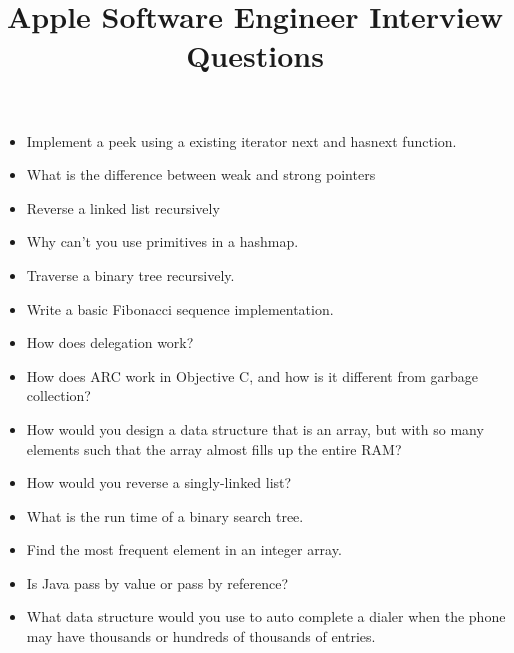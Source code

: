\documentclass{article}
\begin{document}
\title{Apple Software Engineer Interview Questions}
\maketitle
\begin{itemize}
	\item Implement a peek using a existing iterator next and hasnext function.
	\item What is the difference between weak and strong pointers
	\item Reverse a linked list recursively
	\item Why can't you use primitives in a hashmap.
	\item Traverse a binary tree recursively.
	\item Write a basic Fibonacci sequence implementation. 
	\item How does delegation work?
	\item How does ARC work in Objective C, and how is it different from garbage collection?
	\item How would you design a data structure that is an array, but with so many elements such that the array almost fills up the entire RAM?
	\item How would you reverse a singly-linked list?
	\item What is the run time of a binary search tree.
	\item Find the most frequent element in an integer array.
	\item Is Java pass by value or pass by reference?
	\item What data structure would you use to auto complete a dialer when the phone may have thousands or hundreds of thousands of entries.
	
\end{itemize}
\end{document}
